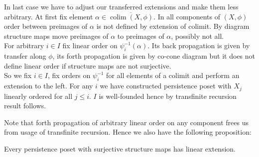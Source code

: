 \begin{pf}
  In last case we have to adjust our transferred extensions and make them less arbitrary. At first fix element $\alpha \in \overline{\operatorname{colim}(X, \phi)}$. In all components of $(X,\phi)$ order between preimages of $\alpha$ is not defined by extension of colimit. By diagram structure maps move preimages of $\alpha$ to preimages of $\alpha$, possibly not all.\\

  For arbitrary $i \in I$ fix linear order on $\psi_i^{-1}(\alpha)$. Its back propagation is given by transfer along $\phi$, its forth propagation is given by co-cone diagram but it does not define linear order if structure maps are not surjective.\\

  So we fix $i \in I$, fix orders on $\psi_i^{-1}$ for all elements of a colimit and perform an extension to the left. For any $i$ we have constructed persistence poset with $X_j$ linearly ordered for all $j \leq i$. $I$ is well-founded hence by transfinite recursion result follows.
\end{pf}

Note that forth propagation of arbitrary linear order on any component frees us from usage of transfinite recursion. Hence we also have the following proposition:\\

\begin{proposition}
  Every persistence poset with surjective structure maps has linear extension.
\end{proposition}

